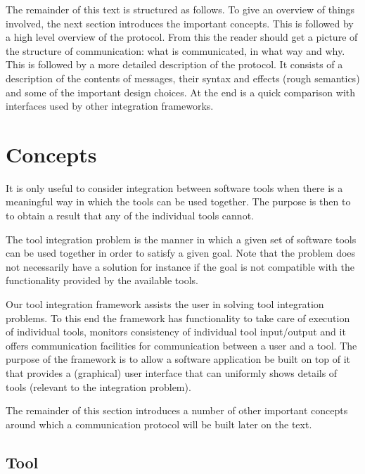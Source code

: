 \documentclass{article}
\begin{document}
  The remainder of this text is structured as follows. To give an overview of
  things involved, the next section introduces the important concepts. This is
  followed by a high level overview of the protocol. From this the reader
  should get a picture of the structure of communication: what is communicated,
  in what way and why. This is followed by a more detailed description of the
  protocol. It consists of a description of the contents of messages, their
  syntax and effects (rough semantics) and some of the important design
  choices.  At the end is a quick comparison with interfaces used by other
  integration frameworks.

 \section{Concepts}

   It is only useful to consider integration between software tools when there
   is a meaningful way in which the tools can be used together. The purpose is
   then to to obtain a result that any of the individual tools cannot.
   
   The tool integration problem is the manner in which a given set of software
   tools can be used together in order to satisfy a given goal. Note that the
   problem does not necessarily have a solution for instance if the goal is not
   compatible with the functionality provided by the available tools.
   
   Our tool integration framework assists the user in solving tool integration
   problems. To this end the framework has functionality to take care of
   execution of individual tools, monitors consistency of individual tool
   input/output and it offers communication facilities for communication
   between a user and a tool. The purpose of the framework is to allow a
   software application be built on top of it that provides a (graphical) user
   interface that can uniformly shows details of tools (relevant to the
   integration problem).
 
   The remainder of this section introduces a number of other important
   concepts around which a communication protocol will be built later on the
   text.

  \subsection{Tool}
\end{document}

